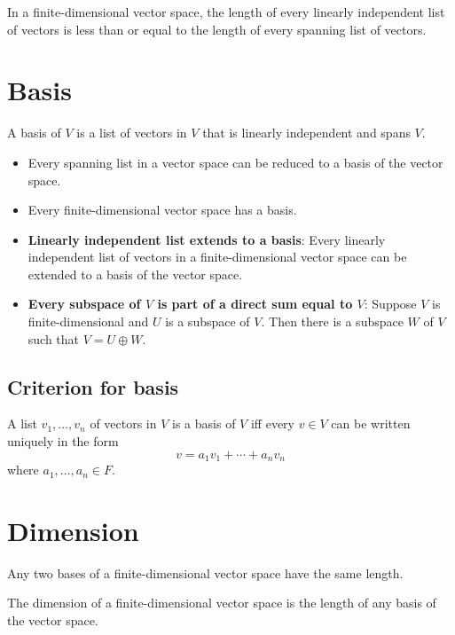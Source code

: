 \begin{theorem}
  In a finite-dimensional vector space, the length of every linearly independent list of vectors is less than or equal to the length of every spanning list of vectors.
\end{theorem}

\section{Basis}
\begin{definition}[Basis]
  A basis of $V$ is a list of vectors in $V$ that is linearly independent and spans $V$.
\end{definition}
\begin{itemize}
  \item Every spanning list in a vector space can be reduced to a basis of the vector space.
  \item Every finite-dimensional vector space has a basis.
  \item \textbf{Linearly independent list extends to a basis}: Every linearly independent list of vectors in a finite-dimensional vector space can be extended to a basis of the vector space.
  \item \textbf{Every subspace of $V$ is part of a direct sum equal to $V$}: Suppose $V$ is finite-dimensional and $U$ is a subspace of $V$. Then there is a subspace $W$ of $V$ such that $V = U \oplus W$.
\end{itemize}

\subsection{Criterion for basis}
A list $v_1, \ldots, v_n$ of vectors in $V$ is a basis of $V$ iff every $v \in V$ can be written uniquely in the form
\[
  v = a_1v_1 + \cdots + a_nv_n
\]
where $a_1,\ldots,a_n \in F$.

\section{Dimension}
\begin{theorem}
  Any two bases of a finite-dimensional vector space have the same length.
\end{theorem}

\begin{definition}[Dimension]
  The dimension of a finite-dimensional vector space is the length of any basis of the vector space.
\end{definition}


